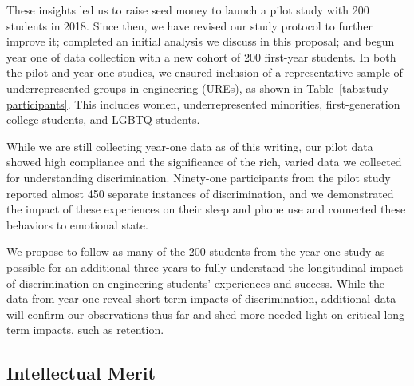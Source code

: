 These insights led us to raise seed money to launch a pilot study with 200 students in 2018. Since then, we have revised our study protocol to further improve it; completed an initial analysis we discuss in this proposal; and begun year one of data collection with a new cohort of 200 first-year students. In both the pilot  and year-one studies, we ensured inclusion of a representative sample of underrepresented groups in engineering (UREs), as shown in Table~\ref{tab:study-participants}. This includes women, underrepresented minorities, first-generation college students, and LGBTQ students. 

While we are still collecting year-one data as of this writing, our pilot data showed high compliance and the significance of the rich, varied data we collected for understanding discrimination. Ninety-one participants from the pilot study reported almost 450 separate instances of discrimination, and we demonstrated the impact of these experiences on their sleep and phone use and connected these behaviors to emotional state.  

We propose to follow as many of the 200 students from the year-one study as possible for an additional three years to fully understand the longitudinal impact of discrimination on engineering students’ experiences and success. While the data from year one reveal short-term impacts of discrimination, additional data will confirm our observations thus far and shed more needed light on critical long-term impacts, such as retention. 

\subsection{Intellectual Merit}
\label{sec:questions}

